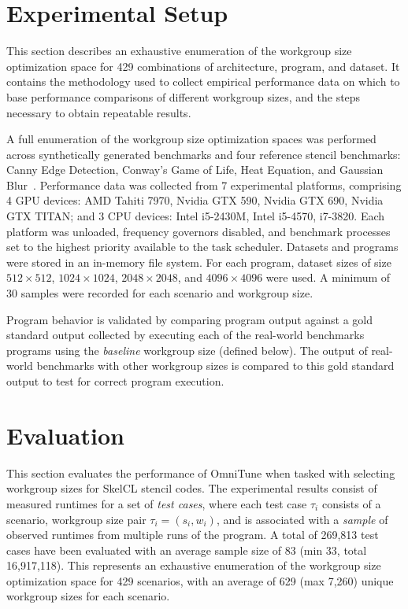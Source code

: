 \documentclass[nonatbib,preprint,nocopyrightspace,9pt]{sigplanconf}
\begin{document}
\section{Experimental Setup}

This section describes an exhaustive enumeration of the workgroup size
optimization space for 429 combinations of architecture, program, and dataset.
It contains the methodology used to collect empirical performance data on which
to base performance comparisons of different workgroup sizes, and the steps
necessary to obtain repeatable results.

A full enumeration of the workgroup size optimization spaces was performed
across synthetically generated benchmarks and four reference stencil benchmarks:
Canny Edge Detection, Conway's Game of Life, Heat Equation, and Gaussian
Blur~\cite{Steuwer2011}. Performance data was collected from 7 experimental
platforms, comprising 4 GPU devices: AMD Tahiti 7970, Nvidia GTX 590, Nvidia GTX
690, Nvidia GTX TITAN; and 3 CPU devices: Intel i5-2430M, Intel i5-4570,
i7-3820. Each platform was unloaded, frequency governors disabled, and benchmark
processes set to the highest priority available to the task scheduler. Datasets
and programs were stored in an in-memory file system. For each program, dataset
sizes of size $512\times512$, $1024\times1024$, $2048\times2048$, and
$4096\times4096$ were used. A minimum of 30 samples were recorded for each
scenario and workgroup size.

Program behavior is validated by comparing program output against a gold
standard output collected by executing each of the real-world benchmarks
programs using the \emph{baseline} workgroup size (defined below). The output of
real-world benchmarks with other workgroup sizes is compared to this gold
standard output to test for correct program execution.


\section{Evaluation}\label{sec:evaluation}

This section evaluates the performance of OmniTune when tasked with selecting
workgroup sizes for SkelCL stencil codes. The experimental results consist of
measured runtimes for a set of \emph{test cases}, where each test case $\tau_i$
consists of a scenario, workgroup size pair $\tau_i = (s_i,w_i)$, and is
associated with a \emph{sample} of observed runtimes from multiple runs of the
program. A total of 269,813 test cases have been evaluated with an average
sample size of 83 (min 33, total 16,917,118). This represents an exhaustive
enumeration of the workgroup size optimization space for 429 scenarios, with an
average of 629 (max 7,260) unique workgroup sizes for each scenario.
\end{document}
